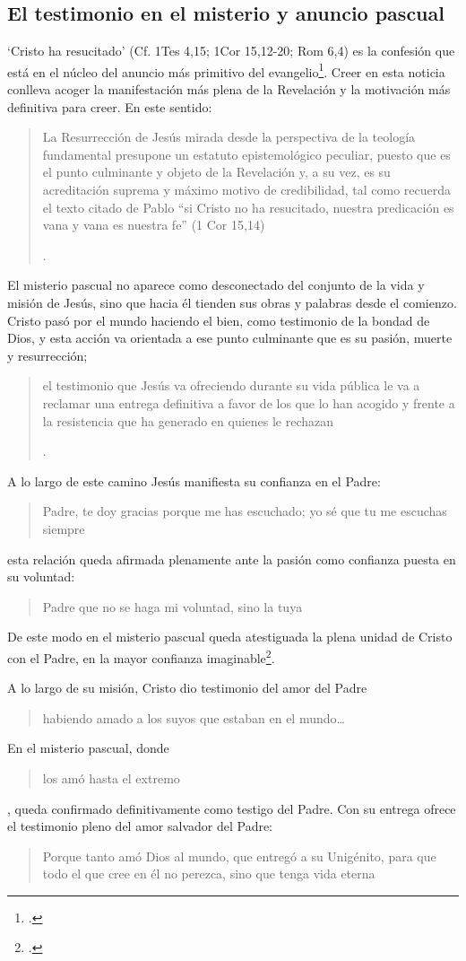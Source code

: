 \subsection{El testimonio en el misterio y anuncio pascual}

\enquote*{Cristo ha resucitado} (Cf. 1Tes 4,15; 1Cor 15,12-20; Rom 6,4) es la confesión que está en el núcleo del anuncio más primitivo del evangelio\footcite[Cf.][403]{ninot2009tf}. Creer en esta noticia conlleva acoger la manifestación más plena de la Revelación y la motivación más definitiva para creer. En este sentido: \blockquote[{\Cite[405]{ninot2009tf}}.]{La Resurrección de Jesús mirada desde la perspectiva de la teología fundamental presupone un estatuto epistemológico peculiar, puesto que es el punto culminante y objeto de la Revelación y, a su vez, es su acreditación suprema y máximo motivo de credibilidad, tal como recuerda el texto citado de Pablo ``si Cristo no ha resucitado, nuestra predicación es vana y vana es nuestra fe'' (1 Cor 15,14)}.

El misterio pascual no aparece como desconectado del conjunto de la vida y misión de Jesús, sino que hacia él tienden sus obras y palabras desde el comienzo. Cristo pasó por el mundo haciendo el bien, como testimonio de la bondad de Dios, y esta acción va orientada a ese punto culminante que es su pasión, muerte y resurrección; \blockquote[{\Cite[127]{prades2015testimonio}}.]{el testimonio que Jesús va ofreciendo durante su vida pública le va a reclamar una entrega definitiva a favor de los que lo han acogido y frente a la resistencia que ha generado en quienes le rechazan}.

A lo largo de este camino Jesús manifiesta su confianza en el Padre: \blockquote[][\,(Jn 11,41b-42a)]{Padre, te doy gracias porque me has escuchado; yo sé que tu me escuchas siempre}; esta relación queda afirmada plenamente ante la pasión como confianza puesta en su voluntad: \blockquote[][\,(Lc 22,42)]{Padre \textelp{} que no se haga mi voluntad, sino la tuya}. De este modo en el misterio pascual queda atestiguada la plena unidad de Cristo con el Padre, en la mayor confianza imaginable\footcite[Cf.][127]{prades2015testimonio}.

A lo largo de su misión, Cristo dio testimonio del amor del Padre \blockquote[][\,(Jn 13,1)]{habiendo amado a los suyos que estaban en el mundo\ldots}. En el misterio pascual, donde \blockquote[][\,(ibíd.)]{los amó hasta el extremo}, queda confirmado definitivamente como testigo del Padre. Con su entrega ofrece el testimonio pleno del amor salvador del Padre: \blockquote[][\,(Jn 3,16)]{Porque tanto amó Dios al mundo, que entregó a su Unigénito, para que todo el que cree en él no perezca, sino que tenga vida eterna}.

